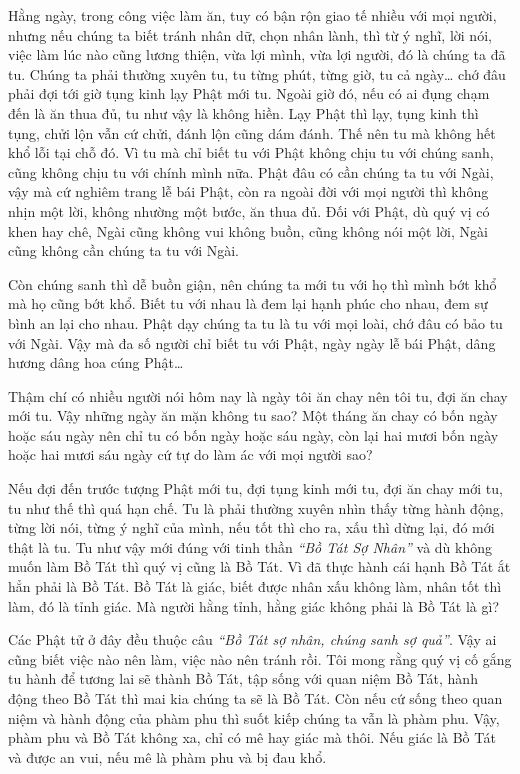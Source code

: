 \documentclass[
  12pt,
  oneside]{book}
\begin{document}
Hằng ngày, trong công việc làm ăn, tuy có bận rộn giao tế nhiều với mọi người, nhưng nếu chúng ta biết tránh nhân dữ, chọn nhân lành, thì từ ý nghĩ, lời nói, việc làm lúc nào cũng lương thiện, vừa lợi mình, vừa lợi người, đó là chúng ta đã tu. Chúng ta phải thường xuyên tu, tu từng phút, từng giờ, tu cả ngày\ldots{} chớ đâu phải đợi tới giờ tụng kinh lạy Phật mới tu. Ngoài giờ đó, nếu có ai đụng chạm đến là ăn thua đủ, tu như vậy là không hiền. Lạy Phật thì lạy, tụng kinh thì tụng, chửi lộn vẫn cứ chửi, đánh lộn cũng dám đánh. Thế nên tu mà không hết khổ lỗi tại chỗ đó. Vì tu mà chỉ biết tu với Phật không chịu tu với chúng sanh, cũng không chịu tu với chính mình nữa. Phật đâu có cần chúng ta tu với Ngài, vậy mà cứ nghiêm trang lễ bái Phật, còn ra ngoài đời với mọi người thì không nhịn một lời, không nhường một bước, ăn thua đủ. Đối với Phật, dù quý vị có khen hay chê, Ngài cũng không vui không buồn, cũng không nói một lời, Ngài cũng không cần chúng ta tu với Ngài.

Còn chúng sanh thì dễ buồn giận, nên chúng ta mới tu với họ thì mình bớt khổ mà họ cũng bớt khổ. Biết tu với nhau là đem lại hạnh phúc cho nhau, đem sự bình an lại cho nhau. Phật dạy chúng ta tu là tu với mọi loài, chớ đâu có bảo tu với Ngài. Vậy mà đa số người chỉ biết tu với Phật, ngày ngày lễ bái Phật, dâng hương dâng hoa cúng Phật\ldots{}

Thậm chí có nhiều người nói hôm nay là ngày tôi ăn chay nên tôi tu, đợi ăn chay mới tu. Vậy những ngày ăn mặn không tu sao? Một tháng ăn chay có bốn ngày hoặc sáu ngày nên chỉ tu có bốn ngày hoặc sáu ngày, còn lại hai mươi bốn ngày hoặc hai mươi sáu ngày cứ tự do làm ác với mọi người sao?

Nếu đợi đến trước tượng Phật mới tu, đợi tụng kinh mới tu, đợi ăn chay mới tu, tu như thế thì quá hạn chế. Tu là phải thường xuyên nhìn thấy từng hành động, từng lời nói, từng ý nghĩ của mình, nếu tốt thì cho ra, xấu thì dừng lại, đó mới thật là tu. Tu như vậy mới đúng với tinh thần \emph{``Bồ Tát Sợ Nhân''} và dù không muốn làm Bồ Tát thì quý vị cũng là Bồ Tát. Vì đã thực hành cái hạnh Bồ Tát ắt hẳn phải là Bồ Tát. Bồ Tát là giác, biết được nhân xấu không làm, nhân tốt thì làm, đó là tỉnh giác. Mà người hằng tỉnh, hằng giác không phải là Bồ Tát là gì?

Các Phật tử ở đây đều thuộc câu \emph{``Bồ Tát sợ nhân, chúng sanh sợ quả''}. Vậy ai cũng biết việc nào nên làm, việc nào nên tránh rồi. Tôi mong rằng quý vị cố gắng tu hành để tương lai sẽ thành Bồ Tát, tập sống với quan niệm Bồ Tát, hành động theo Bồ Tát thì mai kia chúng ta sẽ là Bồ Tát. Còn nếu cứ sống theo quan niệm và hành động của phàm phu thì suốt kiếp chúng ta vẫn là phàm phu. Vậy, phàm phu và Bồ Tát không xa, chỉ có mê hay giác mà thôi. Nếu giác là Bồ Tát và được an vui, nếu mê là phàm phu và bị đau khổ.
\end{document}
